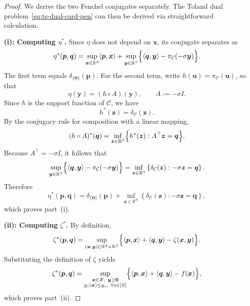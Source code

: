 \documentclass[11pt]{article}
\def\bs{\boldsymbol}
\def\Re{\mathbb{R}}
\def\C{\mathcal{C}}
\def\X{\mathcal{X}}
\begin{document}
\begin{proof}
We derive the two Fenchel conjugates separately. The Toland dual problem~\eqref{eq:ts-dual-card-pen} can then be derived via straightforward calculation.

\smallskip
\noindent\textbf{(i): Computing $\eta^*$.}
Since $\eta$ does not depend on $\bs{x}$, its conjugate separates as
\[
\eta^*(\bs{p},\bs{q})
=
\sup_{\bs{x}\in\Re^d}\langle \bs{p},\bs{x}\rangle
+
\sup_{\bs{y}\in\Re^S}
\Bigl\{
\langle \bs{q},\bs{y}\rangle-\pi_{\C}(-\sigma \bs{y})
\Bigr\}.
\]
The first term equals $\delta_{\{\bs{0}\}}(\bs{p})$.
For the second term, write $h(\bs{u})=\pi_{\C}(\bs{u})$, so that
\[
\eta(\bs{y})=(h\circ A)(\bs{y}),\qquad A:=-\sigma I.
\]
Since $h$ is the support function of $\C$, we have
\[
h^*(\bs{z})=\delta_{\C}(\bs{z}).
\]
By the conjugacy rule for composition with a linear mapping,
\[
(h\circ A)^*(\bs{q})
=
\inf_{\bs{z}\in\Re^S}
\Bigl\{
h^*(\bs{z}) : A^\top \bs{z}=\bs{q}
\Bigr\}.
\]
Because $A^\top=-\sigma I$, it follows that
\[
\sup_{\bs{y}\in\Re^S}
\Bigl\{
\langle \bs{q},\bs{y}\rangle-\pi_{\C}(-\sigma \bs{y})
\Bigr\}
=
\inf_{\bs{z}\in\Re^S}
\left\{
\delta_{\C}(\bs{z}) : -\sigma \bs{z}=\bs{q}
\right\}.
\]
Therefore
\[
\eta^*(\bs{p},\bs{q})
=
\delta_{\{\bs{0}\}}(\bs{p})
+
\inf_{\bs{z}\in\Re^S}
\left\{
\delta_{\C}(\bs{z}) : -\sigma \bs{z}=\bs{q}
\right\},
\]
which proves part~\textnormal{(i)}.

\smallskip
\noindent\textbf{(ii): Computing $\zeta^*$.}
By definition,
\[
\zeta^*(\bs{p},\bs{q})
=
\sup_{(\bs{x},\bs{y})\in\Re^d\times\Re^S}
\Bigl\{
\langle \bs{p},\bs{x}\rangle+\langle \bs{q},\bs{y}\rangle-\zeta(\bs{x},\bs{y})
\Bigr\}.
\]
Substituting the definition of $\zeta$ yields
\[
\zeta^*(\bs{p},\bs{q})
=
\sup_{\substack{\bs{x}\in\X,\ \bs{y}\ge\bs{0}\\ g_s(\bs{x})\le y_s,\ \forall s\in[S]}}
\Bigl\{
\langle \bs{p},\bs{x}\rangle+\langle \bs{q},\bs{y}\rangle-f(\bs{x})
\Bigr\},
\]
which proves part~\textnormal{(ii)}.
\end{proof}
\end{document}
